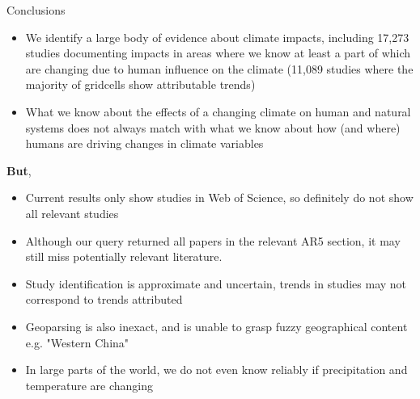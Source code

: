 \documentclass[9pt]{beamer}
\begin{document}
\begin{frame}{Conclusions}

\begin{itemize}
	\item We identify a large body of evidence about climate impacts, including 17,273 studies documenting impacts in areas where we know at least a part of which are changing due to human influence on the climate (11,089 studies where the majority of gridcells show attributable trends)
	\item What we know about the effects of a changing climate on human and natural systems does not always match with what we know about how (and where) humans are driving changes in climate variables 
\end{itemize}

\textbf{But}, 

\begin{itemize}
	\item Current results only show studies in Web of Science, so definitely do not show all relevant studies
	\item Although our query returned all papers in the relevant AR5 section, it may still miss potentially relevant literature.
	\item Study identification is approximate and uncertain, trends in studies may not correspond to trends attributed
	\item Geoparsing is also inexact, and is unable to grasp fuzzy geographical content e.g. "Western China"
	\item In large parts of the world, we do not even know reliably if precipitation and temperature are changing
\end{itemize}

\end{frame}
\end{document}
